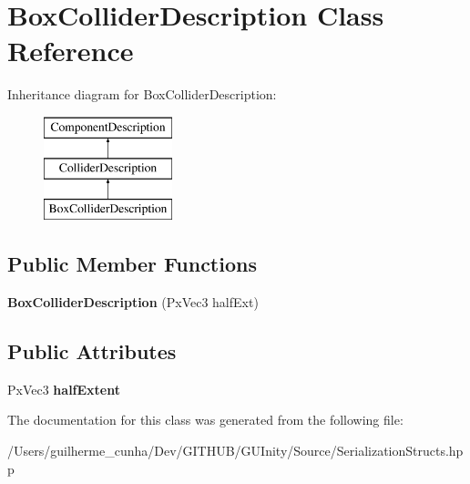 \hypertarget{class_box_collider_description}{}\section{Box\+Collider\+Description Class Reference}
\label{class_box_collider_description}
Inheritance diagram for Box\+Collider\+Description\+:\begin{figure}[H]
\begin{center}
\leavevmode
\includegraphics[height=3.000000cm]{class_box_collider_description}
\end{center}
\end{figure}
\subsection*{Public Member Functions}
\begin{DoxyCompactItemize}
\item 
\hypertarget{class_box_collider_description_aeb4b0b95f200e50eedb2b48fcdb09b80}{}{\bfseries Box\+Collider\+Description} (Px\+Vec3 half\+Ext)\label{class_box_collider_description_aeb4b0b95f200e50eedb2b48fcdb09b80}

\end{DoxyCompactItemize}
\subsection*{Public Attributes}
\begin{DoxyCompactItemize}
\item 
\hypertarget{class_box_collider_description_ac15affc1552dc9505b787ef6d6a05571}{}Px\+Vec3 {\bfseries half\+Extent}\label{class_box_collider_description_ac15affc1552dc9505b787ef6d6a05571}

\end{DoxyCompactItemize}


The documentation for this class was generated from the following file\+:\begin{DoxyCompactItemize}
\item 
/\+Users/guilherme\+\_\+cunha/\+Dev/\+G\+I\+T\+H\+U\+B/\+G\+U\+Inity/\+Source/Serialization\+Structs.\+hpp\end{DoxyCompactItemize}
